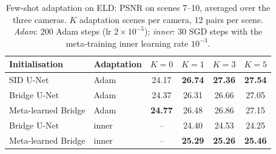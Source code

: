 \begin{table}[t]
\centering
\caption{Zero-shot transfer to the ELD cameras, models trained on SID Sony only. PSNR per camera and over all (full images of scenes 7--10, ratios 100 and 200, 24 pairs per camera), then SSIM, MS-SSIM and LPIPS over all pairs. Best value per column in bold.}
\label{tab:cross}
\small
{}
\end{table}

\begin{table}[t]
\centering
\caption{Few-shot adaptation on ELD: PSNR on scenes 7--10, averaged over the three cameras. $K$ adaptation scenes per camera, 12 pairs per scene. \emph{Adam}: 200 Adam steps (lr $2\times10^{-5}$); \emph{inner}: 30 SGD steps with the meta-training inner learning rate $10^{-3}$.}
\label{tab:fewshot}
\small
\begin{tabular}{@{}llcccc@{}}
\toprule
Initialisation & Adaptation & $K=0$ & $K=1$ & $K=3$ & $K=5$ \\
\midrule
SID U-Net & Adam & 24.17 & \textbf{26.74} & \textbf{27.36} & \textbf{27.54} \\
Bridge U-Net & Adam & 24.37 & 26.31 & 26.66 & 27.05 \\
Meta-learned Bridge & Adam & \textbf{24.77} & 26.48 & 26.86 & 27.15 \\
\midrule
Bridge U-Net & inner & -- & 24.40 & 24.53 & 24.25 \\
Meta-learned Bridge & inner & -- & \textbf{25.29} & \textbf{25.26} & \textbf{25.46} \\
\bottomrule
\end{tabular}
\end{table}

